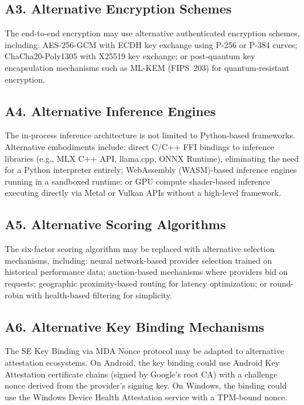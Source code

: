 \documentclass[11pt,letterpaper]{article}
\begin{document}
\subsection{A3. Alternative Encryption Schemes}

The end-to-end encryption may use alternative authenticated encryption schemes, including: AES-256-GCM with ECDH key exchange using P-256 or P-384 curves; ChaCha20-Poly1305 with X25519 key exchange; or post-quantum key encapsulation mechanisms such as ML-KEM (FIPS~203) for quantum-resistant encryption.

\subsection{A4. Alternative Inference Engines}

The in-process inference architecture is not limited to Python-based frameworks. Alternative embodiments include: direct C/C++ FFI bindings to inference libraries (e.g., MLX C++ API, llama.cpp, ONNX Runtime), eliminating the need for a Python interpreter entirely; WebAssembly (WASM)-based inference engines running in a sandboxed runtime; or GPU compute shader-based inference executing directly via Metal or Vulkan APIs without a high-level framework.

\subsection{A5. Alternative Scoring Algorithms}

The six-factor scoring algorithm may be replaced with alternative selection mechanisms, including: neural network-based provider selection trained on historical performance data; auction-based mechanisms where providers bid on requests; geographic proximity-based routing for latency optimization; or round-robin with health-based filtering for simplicity.

\subsection{A6. Alternative Key Binding Mechanisms}

The SE Key Binding via MDA Nonce protocol may be adapted to alternative attestation ecosystems. On Android, the key binding could use Android Key Attestation certificate chains (signed by Google's root CA) with a challenge nonce derived from the provider's signing key. On Windows, the binding could use the Windows Device Health Attestation service with a TPM-bound nonce.
\end{document}
